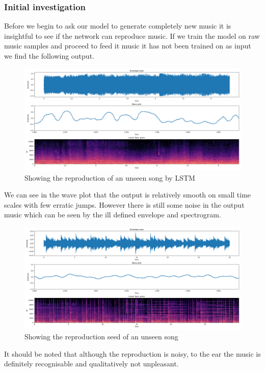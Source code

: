 \documentclass{article}
\begin{document}
\subsubsection{Initial investigation}
Before we begin to ask our model to generate completely new music it is insightful to see if the network can reproduce music. If we train the model on raw music samples and proceed to feed it music it has not been trained on as input we find the following output.
\begin{figure}[H]
\caption{Showing the reproduction of an unseen song by LSTM}
\includegraphics[scale=0.35]{reproduce1.png}
\end{figure}
We can see in the wave plot that the output is relatively smooth on small time scales with few erratic jumps. However there is still some noise in the output music which can be seen by the ill defined envelope and spectrogram. 
\begin{figure}[H]
\caption{Showing the reproduction seed of an unseen song}
\includegraphics[scale=0.35]{reproductionSeed.png}
\end{figure}
It should be noted that although the reproduction is noisy, to the ear the music is definitely recognisable and qualitatively not unpleasant. 
\end{document}
